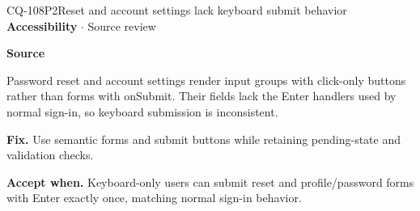 \begin{finding}{CQ-108}{P2}{Reset and account settings lack keyboard submit behavior}
\textbf{Accessibility} $\cdot$ Source review\par
\textbf{Source}\quad{}\par
Password reset and account settings render input groups with click-only buttons rather than forms with onSubmit. Their fields lack the Enter handlers used by normal sign-in, so keyboard submission is inconsistent.\par
\textbf{Fix.} Use semantic forms and submit buttons while retaining pending-state and validation checks.\par
\textbf{Accept when.} Keyboard-only users can submit reset and profile/password forms with Enter exactly once, matching normal sign-in behavior.
\end{finding}
\clearpage
